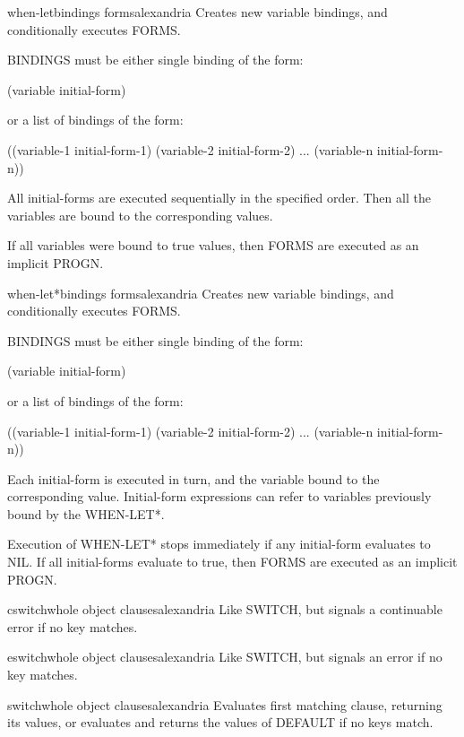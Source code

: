 \begin{macro}{when-let}{bindings \body forms}{alexandria}{}
  Creates new variable bindings, and conditionally executes FORMS.

BINDINGS must be either single binding of the form:

 (variable initial-form)

or a list of bindings of the form:

 ((variable-1 initial-form-1)
  (variable-2 initial-form-2)
  ...
  (variable-n initial-form-n))

All initial-forms are executed sequentially in the specified order. Then all
the variables are bound to the corresponding values.

If all variables were bound to true values, then FORMS are executed as an
implicit PROGN.
\end{macro}

\begin{macro}{when-let*}{bindings \body forms}{alexandria}{}
  Creates new variable bindings, and conditionally executes FORMS.

BINDINGS must be either single binding of the form:

 (variable initial-form)

or a list of bindings of the form:

 ((variable-1 initial-form-1)
  (variable-2 initial-form-2)
  ...
  (variable-n initial-form-n))

Each initial-form is executed in turn, and the variable bound to the
corresponding value. Initial-form expressions can refer to variables
previously bound by the WHEN-LET*.

Execution of WHEN-LET* stops immediately if any initial-form evaluates to NIL.
If all initial-forms evaluate to true, then FORMS are executed as an implicit
PROGN.
\end{macro}

\begin{macro}{cswitch}{\whole whole object \body clauses}{alexandria}{}
  Like SWITCH, but signals a continuable error if no key matches.
\end{macro}

\begin{macro}{eswitch}{\whole whole object \body clauses}{alexandria}{}
  Like SWITCH, but signals an error if no key matches.
\end{macro}

\begin{macro}{switch}{\whole whole object \body clauses}{alexandria}{}
  Evaluates first matching clause, returning its values, or evaluates and
returns the values of DEFAULT if no keys match.
\end{macro}

